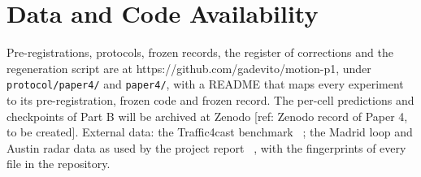 \section*{Data and Code Availability}
Pre-registrations, protocols, frozen records, the register of corrections and the regeneration script are at https://github.com/gadevito/motion-p1, under \texttt{protocol/\allowbreak{}paper4/\allowbreak{}} and \texttt{paper4/\allowbreak{}}, with a README that maps every experiment to its pre-registration, frozen code and frozen record. The per-cell predictions and checkpoints of Part B will be archived at Zenodo [ref: Zenodo record of Paper 4, to be created]. External data: the Traffic4cast benchmark ~\cite{neun2023t4c}; the Madrid loop and Austin radar data as used by the project report ~\cite{motion2026uc04}, with the fingerprints of every file in the repository.

